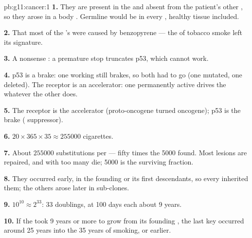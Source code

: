 \begin{solution}{pb:g11:cancer:1}
\textbf{1.} They are present in the  and absent from the
patient's other , so they arose in a body . Germline
 would be in every , healthy tissue included.

\textbf{2.} That most of the 's  were caused by
benzopyrene --- the  of tobacco smoke left its signature.

\textbf{3.} A nonsense : a premature stop  truncates
p53, which cannot work.

\textbf{4.} p53 is a brake: one working  still brakes, so both
had to go (one mutated, one deleted). The receptor is an accelerator:
one permanently active  drives the  whatever the other
 does.

\textbf{5.} The receptor  is the accelerator (proto-oncogene
turned oncogene); p53 is the brake ( suppressor).

\textbf{6.} $20 \times 365 \times 35 \approx \num{255000}$ cigarettes.

\textbf{7.} About $\num{255000}$ substitutions per  --- fifty times
the 5000 found. Most lesions are repaired, and  with too many
 die; 5000 is the surviving fraction.

\textbf{8.} They occurred early, in the founding  or its first
descendants, so every   inherited them; the others arose
later in sub-clones.

\textbf{9.} $10^{10} \approx 2^{33}$: 33 doublings, at 100 days each
about 9 years.

\textbf{10.} If the  took 9 years or more to grow from its
founding , the last key  occurred around 25 years into
the 35 years of smoking, or earlier.


\end{solution}
